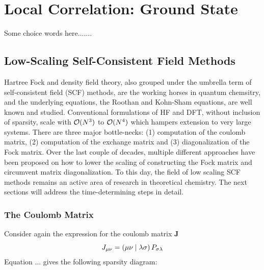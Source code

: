 \chapter{Local Correlation: Ground State \label{cha:LOCAL1}}

Some choice words here.......

\section{Low-Scaling Self-Consistent Field Methods}

Hartree Fock and density field theory, also grouped under the umbrella term of self-consistent field (SCF) methods, are the working horses in quantum chemsitry, and the underlying equations, the Roothan and Kohn-Sham equations, are well known and studied. Conventional formulations of HF and DFT, without inclusion of sparsity, scale with $\mathcal{O}(N^{3})$ to $\mathcal{O}(N^{4})$ which hampers extension to very large systems. There are three major bottle-necks: (1) computation of the coulomb matrix, (2) computation of the exchange matrix and (3) diagonalization of the Fock matrix. Over the last couple of decades, multiple different approaches have been proposed on how to lower the scaling of constructing the Fock matrix and circumvent matrix diagonalization. To this day, the field of low scaling SCF methods remains an active area of research in theoretical chemistry. The next sections will address the time-determining steps in detail.

\subsection{The Coulomb Matrix}

Consider again the expression for the coulomb matrix $\mathbf{J}$ 
\begin{equation}
J_{\mu\nu} = \left( \mu\nu \mid \lambda\sigma \right) P_{\sigma\lambda}
\end{equation}
\noindent Equation ... gives the following sparsity diagram:

\begin{center}
\end{center}

